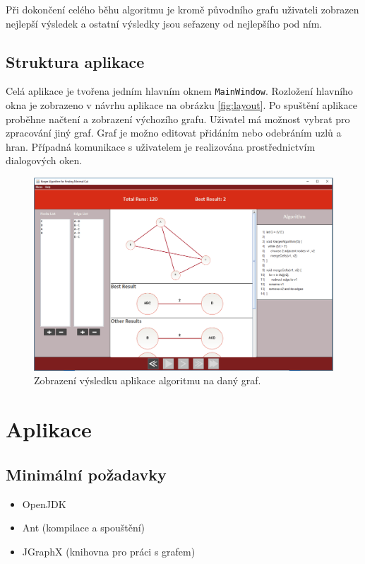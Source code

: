 \documentclass[../projekt.tex]{subfiles}
\begin{document}
Při dokončení celého běhu algoritmu je kromě původního grafu uživateli zobrazen nejlepší výsledek a ostatní výsledky
jsou seřazeny od nejlepšího pod ním.

\subsection{Struktura aplikace}

Celá aplikace je tvořena jedním hlavním oknem \texttt{MainWindow}. Rozložení hlavního okna
je zobrazeno v návrhu aplikace na obrázku \ref{fig:layout}. Po spuštění aplikace
proběhne načtení a zobrazení výchozího grafu. Uživatel má možnost vybrat pro
zpracování jiný graf. Graf je možno editovat přidáním nebo odebráním uzlů a hran.
Případná komunikace s uživatelem je realizována prostřednictvím dialogových oken. 


	\begin{figure}[ht]
    	\begin{center}
  			\includegraphics[scale=0.4]{obrazky-figures/finish.png}
  			\caption{Zobrazení výsledku aplikace algoritmu na daný graf.}
  		\end{center}
	\end{figure}


\section{Aplikace}

\subsection{Minimální požadavky}

\begin{itemize}
	\item OpenJDK
	\item Ant (kompilace a spouštění)
	\item JGraphX (knihovna pro práci s grafem)
\end{itemize}
\end{document}

